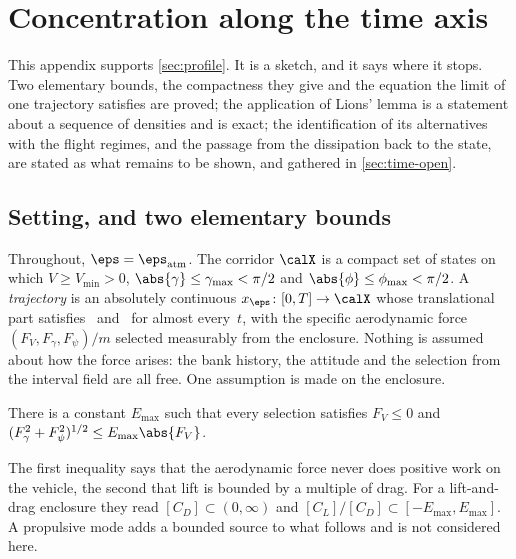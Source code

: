 
\section{Concentration along the time axis}
\label{apx:time}

This appendix supports \cref{sec:profile}. It is a sketch, and it says
where it stops. Two elementary bounds, the compactness they give and the
equation the limit of one trajectory satisfies are proved; the application
of Lions' lemma is a statement about a sequence of densities and is exact;
the identification of its alternatives with the flight regimes, and the
passage from the dissipation back to the state, are stated as what remains
to be shown, and gathered in \cref{sec:time-open}.

\subsection{Setting, and two elementary bounds}\label{sec:time-setting}

Throughout, $\eps = \eps_{\mathrm{atm}}$. The corridor $\calX$ is a compact
set of states on which $V \ge V_{\min} > 0$,
$\abs{\gamma}\le\gamma_{\max}<\pi/2$ and $\abs{\phi}\le\phi_{\max}<\pi/2$.
A \emph{trajectory} is an absolutely continuous
$x_\eps\colon[0,T]\to\calX$ whose translational part
satisfies~ and~
for almost every~$t$, with the specific aerodynamic force
$(F_V,F_\gamma,F_\psi)/m$ selected measurably from the enclosure. Nothing is
assumed about how the force arises: the bank history, the attitude and the
selection from the interval field are all free. One assumption is made on
the enclosure.

\begin{assum}\label{asm:dissipative}
There is a constant $E_{\max}$ such that every selection satisfies
$F_V \le 0$ and $(F_\gamma^2 + F_\psi^2)^{1/2} \le E_{\max}\abs{F_V}$.
\end{assum}

The first inequality says that the aerodynamic force never does positive
work on the vehicle, the second that lift is bounded by a multiple of drag.
For a lift-and-drag enclosure they read $[C_D]\subset(0,\infty)$ and
$[C_L]/[C_D]\subset[-E_{\max},E_{\max}]$. A propulsive mode adds a bounded
source to what follows and is not considered here.

